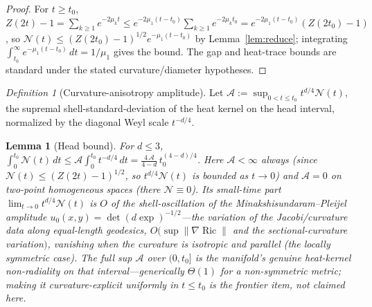 \documentclass[11pt]{article}
\newtheorem{lemma}[theorem]{Lemma}
\theoremstyle{remark}
\newtheorem{definition}[theorem]{Definition}
\DeclareMathOperator{\Ric}{Ric}
\begin{document}
\begin{proof}
For $t\ge t_0$, $Z(2t)-1=\sum_{k\ge1}e^{-2\mu_k t}\le e^{-2\mu_1(t-t_0)}\sum_{k\ge1}e^{-2\mu_k t_0}
=e^{-2\mu_1(t-t_0)}(Z(2t_0)-1)$, so $\mathcal N(t)\le(Z(2t_0)-1)^{1/2}e^{-\mu_1(t-t_0)}$ by
Lemma~\ref{lem:reduce}; integrating $\int_{t_0}^\infty e^{-\mu_1(t-t_0)}\,dt=1/\mu_1$ gives the
bound. The gap and heat-trace bounds are standard under the stated curvature/diameter
hypotheses.
\end{proof}

\begin{definition}[Curvature-anisotropy amplitude]\label{def:aniso}
Let $\mathcal A:=\sup_{0<t\le t_0}t^{d/4}\mathcal N(t)$, the supremal shell-standard-deviation
of the heat kernel on the head interval, normalized by the diagonal Weyl scale $t^{-d/4}$.
\end{definition}

\begin{lemma}[Head bound]\label{lem:head}
For $d\le3$, $\displaystyle\int_0^{t_0}\mathcal N(t)\,dt\le\mathcal A\int_0^{t_0}t^{-d/4}\,dt
=\frac{4\,\mathcal A}{4-d}\,t_0^{(4-d)/4}$. Here $\mathcal A<\infty$ always (since
$\mathcal N(t)\le(Z(2t)-1)^{1/2}$, so $t^{d/4}\mathcal N(t)$ is bounded as $t\to0$) and
$\mathcal A=0$ on two-point homogeneous spaces (there $\mathcal N\equiv0$). Its
\emph{small-time} part $\lim_{t\to0}t^{d/4}\mathcal N(t)$ is $O$ of the shell-oscillation of
the Minakshisundaram--Pleijel amplitude $u_0(x,y)=\det(d\exp)^{-1/2}$---the variation of the
Jacobi/curvature data along equal-length geodesics, $O(\sup\lVert\nabla\Ric\rVert$ and the
sectional-curvature variation$)$, vanishing when the curvature is isotropic and parallel (the
locally symmetric case). The \emph{full} sup $\mathcal A$ over $(0,t_0]$ is the manifold's
genuine heat-kernel non-radiality on that interval---generically $\Theta(1)$ for a
non-symmetric metric; making it curvature-explicit uniformly in $t\le t_0$ is the frontier
item, not claimed here.
\end{lemma}
\end{document}
